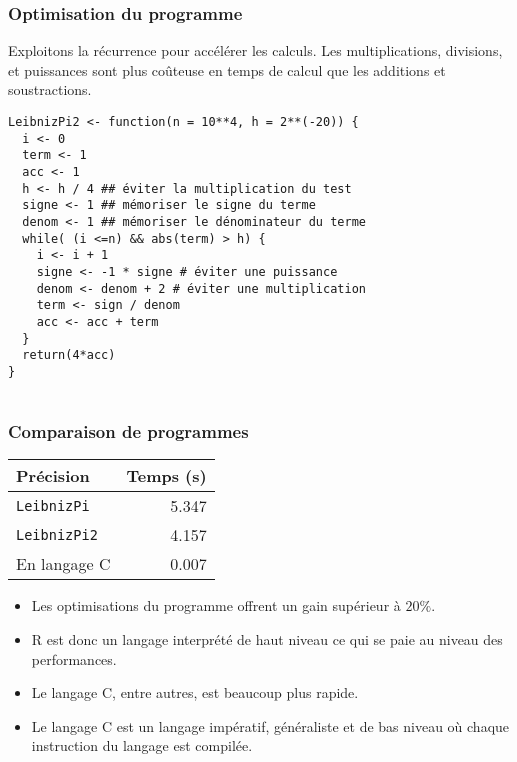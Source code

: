 \documentclass[10pt]{beamer}
\begin{document}
\begin{frame}[fragile]
  \frametitle{Optimisation du programme}
  \begin{alertblock}{Exploitons la récurrence pour accélérer les calculs.}
    \alert{Les multiplications, divisions, et puissances sont plus coûteuse en temps de calcul que les additions et soustractions.}
  \end{alertblock}

  \begin{lstlisting}
LeibnizPi2 <- function(n = 10**4, h = 2**(-20)) {
  i <- 0
  term <- 1
  acc <- 1
  h <- h / 4 ## éviter la multiplication du test
  signe <- 1 ## mémoriser le signe du terme 
  denom <- 1 ## mémoriser le dénominateur du terme
  while( (i <=n) && abs(term) > h) {
    i <- i + 1
    signe <- -1 * signe # éviter une puissance
    denom <- denom + 2 # éviter une multiplication
    term <- sign / denom
    acc <- acc + term
  }
  return(4*acc)
}
    
  \end{lstlisting}
\end{frame}

\begin{frame}
  \frametitle{Comparaison de programmes}

  
    \begin{table}[h]
    \centering
    \begin{tabular}{lr}
      \toprule
      Précision           & Temps (s) \\
      \midrule
      \texttt{LeibnizPi}  & 5.347     \\
      \texttt{LeibnizPi2} & 4.157     \\
      En langage C        & 0.007     \\
             \bottomrule
    \end{tabular}
  \end{table}

  \begin{itemize}
  \item Les optimisations du programme offrent un gain supérieur à $20\%$.
  \item R est donc un langage interprété de haut niveau ce qui se paie au niveau des performances.
  \item Le langage C, entre autres, est beaucoup plus rapide.
  \item Le langage C est un langage impératif, généraliste et de bas niveau où chaque instruction du langage est compilée.
  \end{itemize}

\end{frame}
\end{document}
